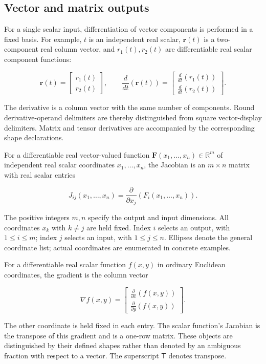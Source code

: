 \documentclass[11pt,oneside,openany]{book}
\begin{document}
\subsection{Vector and matrix outputs}

For a single scalar input, differentiation of vector components is
performed in a fixed basis. For example, \(t\) is an independent real scalar,
\(\mathbf r(t)\) is a two-component real column vector, and \(r_1(t),r_2(t)\)
are differentiable real scalar component functions:

\[
\mathbf r(t)=\begin{bmatrix}r_1(t)\\r_2(t)\end{bmatrix},
\qquad
\frac{d}{dt}\left(\mathbf r(t)\right)
=\begin{bmatrix}
\frac{d}{dt}\left(r_1(t)\right)\\
\frac{d}{dt}\left(r_2(t)\right)
\end{bmatrix}.
\]

The derivative is a column vector with the same number of components.
Round derivative-operand delimiters are thereby distinguished from square
vector-display delimiters. Matrix and tensor derivatives are accompanied
by the corresponding shape declarations.

For a differentiable real vector-valued function
\(\mathbf F(x_1,\ldots,x_n)\in\mathbb R^m\) of independent real scalar
coordinates \(x_1,\ldots,x_n\), the Jacobian is an \(m\times n\) matrix with
real scalar entries

\[
J_{ij}(x_1,\ldots,x_n)
=\frac{\partial}{\partial x_j}\left(F_i(x_1,\ldots,x_n)\right).
\]

The positive integers \(m,n\) specify the output and input dimensions.
All coordinates \(x_k\) with \(k\ne j\) are held fixed. Index \(i\) selects an
output, with \(1\leq i\leq m\); index \(j\) selects an input, with
\(1\leq j\leq n\). Ellipses denote the general coordinate list; actual
coordinates are enumerated in concrete examples.

For a differentiable real scalar function \(f(x,y)\) in ordinary Euclidean
coordinates, the gradient is the column vector

\[
\nabla f(x,y)=
\begin{bmatrix}
\frac{\partial}{\partial x}\left(f(x,y)\right)\\
\frac{\partial}{\partial y}\left(f(x,y)\right)
\end{bmatrix}.
\]

The other coordinate is held fixed in each entry. The scalar function's
Jacobian is the transpose of this gradient and is a one-row matrix. These
objects are distinguished by their defined shapes rather than denoted by
an ambiguous fraction with respect to a vector. The superscript
\(\mathsf T\) denotes transpose.
\clearpage
\end{document}
